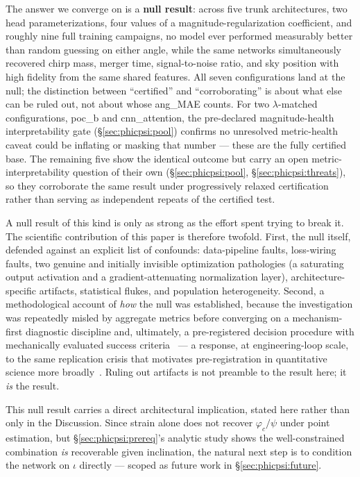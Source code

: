 \documentclass[11pt]{article}
\begin{document}
The answer we converge on is a \textbf{null result}: across five trunk architectures, two head parameterizations, four values of a magnitude-regularization coefficient, and roughly nine full training campaigns, no model ever performed measurably better than random guessing on either angle, while the same networks simultaneously recovered chirp mass, merger time, signal-to-noise ratio, and sky position with high fidelity from the same shared features.
All seven configurations land at the null; the distinction between ``certified'' and ``corroborating'' is about what else can be ruled out, not about whose ang\_MAE counts.
For two $\lambda$-matched configurations, poc\_b and cnn\_attention, the pre-declared magnitude-health interpretability gate (\S\ref{sec:phicpsi:pool}) confirms no unresolved metric-health caveat could be inflating or masking that number --- these are the fully certified base.
The remaining five show the identical outcome but carry an open metric-interpretability question of their own (\S\ref{sec:phicpsi:pool}, \S\ref{sec:phicpsi:threats}), so they corroborate the same result under progressively relaxed certification rather than serving as independent repeats of the certified test.

A null result of this kind is only as strong as the effort spent trying to break it.
The scientific contribution of this paper is therefore twofold.
First, the null itself, defended against an explicit list of confounds: data-pipeline faults, loss-wiring faults, two genuine and initially invisible optimization pathologies (a saturating output activation and a gradient-attenuating normalization layer), architecture-specific artifacts, statistical flukes, and population heterogeneity.
Second, a methodological account of \emph{how} the null was established, because the investigation was repeatedly misled by aggregate metrics before converging on a mechanism-first diagnostic discipline and, ultimately, a pre-registered decision procedure with mechanically evaluated success criteria~\citep{nosek2018preregistration} --- a response, at engineering-loop scale, to the same replication crisis that motivates pre-registration in quantitative science more broadly~\citep{ioannidis2005false}.
Ruling out artifacts is not preamble to the result here; it \emph{is} the result.

This null result carries a direct architectural implication, stated here rather than only in the Discussion.
Since strain alone does not recover $\varphi_c/\psi$ under point estimation, but \S\ref{sec:phicpsi:prereq}'s analytic study shows the well-constrained combination \emph{is} recoverable given inclination, the natural next step is to condition the network on $\iota$ directly --- scoped as future work in \S\ref{sec:phicpsi:future}.
\end{document}
